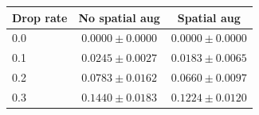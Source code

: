\begin{tabular}{lcc}
\toprule
Drop rate & No spatial aug & Spatial aug \\
\midrule
0.0 & $0.0000\pm0.0000$ & $0.0000\pm0.0000$ \\
0.1 & $0.0245\pm0.0027$ & $0.0183\pm0.0065$ \\
0.2 & $0.0783\pm0.0162$ & $0.0660\pm0.0097$ \\
0.3 & $0.1440\pm0.0183$ & $0.1224\pm0.0120$ \\
\bottomrule
\end{tabular}

